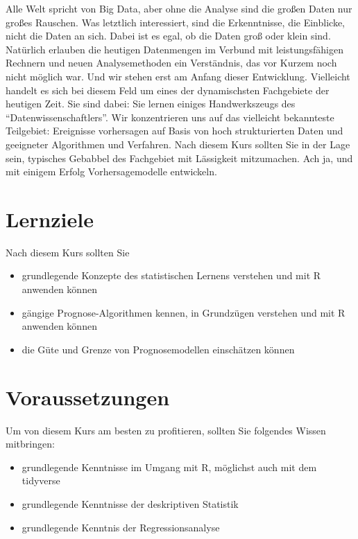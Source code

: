 \documentclass[
]{book}
\providecommand{\tightlist}{%
  \setlength{\itemsep}{0pt}\setlength{\parskip}{0pt}}
\begin{document}
Alle Welt spricht von Big Data, aber ohne die Analyse sind die großen Daten nur großes Rauschen. Was letztlich interessiert, sind die Erkenntnisse, die Einblicke, nicht die Daten an sich.
Dabei ist es egal, ob die Daten groß oder klein sind.
Natürlich erlauben die heutigen Datenmengen im Verbund mit leistungsfähigen Rechnern und neuen Analysemethoden ein Verständnis,
das vor Kurzem noch nicht möglich war.
Und wir stehen erst am Anfang dieser Entwicklung.
Vielleicht handelt es sich bei diesem Feld um eines der dynamischsten Fachgebiete der heutigen Zeit.
Sie sind dabei: Sie lernen einiges Handwerkszeugs des ``Datenwissenschaftlers''.
Wir konzentrieren uns auf das vielleicht bekannteste Teilgebiet:
Ereignisse vorhersagen auf Basis von hoch strukturierten Daten
und geeigneter Algorithmen und Verfahren.
Nach diesem Kurs sollten Sie in der Lage sein,
typisches Gebabbel des Fachgebiet mit Lässigkeit mitzumachen.
Ach ja, und mit einigem Erfolg Vorhersagemodelle entwickeln.

\hypertarget{lernziele}{%
\section{Lernziele}\label{lernziele}}

Nach diesem Kurs sollten Sie

\begin{itemize}
\tightlist
\item
  grundlegende Konzepte des statistischen Lernens verstehen und mit R anwenden können
\item
  gängige Prognose-Algorithmen kennen, in Grundzügen verstehen und mit R anwenden können
\item
  die Güte und Grenze von Prognosemodellen einschätzen können
\end{itemize}

\hypertarget{voraussetzungen}{%
\section{Voraussetzungen}\label{voraussetzungen}}

Um von diesem Kurs am besten zu profitieren,
sollten Sie folgendes Wissen mitbringen:

\begin{itemize}
\tightlist
\item
  grundlegende Kenntnisse im Umgang mit R, möglichst auch mit dem tidyverse
\item
  grundlegende Kenntnisse der deskriptiven Statistik
\item
  grundlegende Kenntnis der Regressionsanalyse
\end{itemize}
\end{document}
